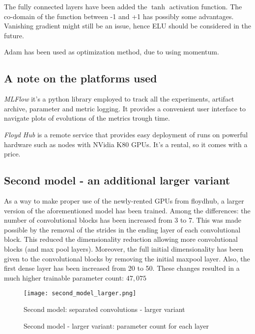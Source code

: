 The fully connected layers have been added the $\tanh$ activation function.
The co-domain of the function between -1 and +1 has possibly some advantages.
Vanishing gradient might still be an issue, hence ELU should be considered in the future.

Adam has been used as optimization method, due to using momentum.

\subsection{A note on the platforms used}

\emph{MLFlow} it's a python library employed to track all the experiments, artifact archive,
parameter and metric logging. It provides a convenient user interface to navigate
plots of evolutions of the metrics trough time.

\emph{Floyd Hub} is a remote service that provides easy deployment of runs 
on powerful
hardware such as nodes with NVidia K80 GPUs. It's a rental, so it comes with a price.


\subsection{Second model - an additional larger variant}

As a way to make proper use of the newly-rented GPUs from floydhub,
a larger version of the aforementioned model has been trained.
Among the differences: the number of convolutional blocks has been
increased from 3 to 7. This was made possible by the removal of the strides in the 
ending layer of each convolutional block. This reduced the dimensionality reduction
allowing more convolutional blocks (and max pool layers).
Moreover, the full initial dimensionality has been given to the convolutional blocks by
removing the initial maxpool layer.
Also, the first dense layer has been increased from 20 to 50. 
These changes resulted in a much higher trainable parameter count: $47,075$

\begin{figure}[h]
\caption{Second model: separated convolutions - larger variant}
\centering
\texttt{[image: second\_model\_larger.png]}
\end{figure}

\begin{figure}[h]
\caption{Second model - larger variant: parameter count for each layer}
\centering
\scriptsize

\end{figure}

